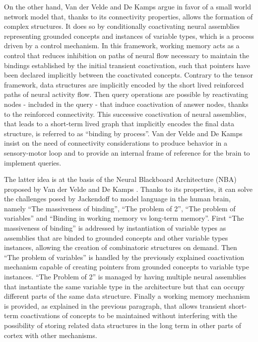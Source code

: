 \documentclass[10pt]{article}
\begin{document}
On the other hand, Van der Velde and De Kamps \cite{van_der_Velde_2015} argue in favor of a small world network model that, thanks to its connectivity properties, allows the formation of complex structures.
It does so by conditionally coactivating neural assemblies representing grounded concepts and instances of variable types, which is a process driven by a control mechanism.
In this framework, working memory acts as a control that reduces inhibition on paths of neural flow necessary to maintain the bindings 
established by the initial transient coactivation, such that pointers have been  declared implicitly between the coactivated concepts.
Contrary to the tensor framework, data structures are implicitly encoded by the short lived reinforced paths of neural activity flow.
Then query operations are possible by reactivating nodes - included in the query - that induce coactivation of answer nodes, thanks to the reinforced connectivity.
This successive coactivation of neural assemblies, that leads to a short-term lived graph that implicitly encodes the final data structure, 
is referred to as ``binding by process''.
Van der Velde and De Kamps insist on the need of connectivity considerations to produce behavior in a sensory-motor loop and to provide an internal frame of reference for the brain to implement queries.

The latter idea is at the basis of the Neural Blackboard Architecture (NBA) proposed by Van der Velde and De Kamps \cite{van_der_Velde_2006}. Thanks to its properties, 
it can solve the challenges posed by Jackendoff to model language in the human brain, namely ``The massiveness of binding'', ``The problem of 2'', ``The problem of variables'' and ``Binding in working memory vs long-term memory''.
First ``The massiveness of binding'' is addressed by instantiation of variable types as assemblies that are binded to grounded concepts and other variable types instances, 
allowing the creation of combinatoric structures on demand.
Then ``The problem of variables'' is handled by the previously explained coactivation mechanism capable of creating pointers from grounded concepts to variable type instances.
``The Problem of 2'' is managed by having multiple neural assemblies that instantiate the same variable type in the architecture but that can occupy different parts of the same data structure.
Finally a working memory mechanism is provided, as explained in the previous paragraph, that allows transient short-term coactivations of concepts to be maintained without interfering with the possibility of storing related data structures in the long term in other parts of cortex with other mechanisms.
\end{document}
